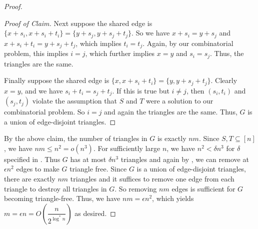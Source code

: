 \begin{proof}
\begin{proof}[Proof of Claim]
		Next suppose the shared edge is $\{x+s_i, x+s_i+t_i\} = \{y+s_j, y+s_j+t_j\}$. So we have $x + s_i = y+s_j$ and $x+s_i+t_i = y+s_j+t_j$, which implies $t_i = t_j$. Again, by our combinatorial problem, this implies $i = j$, which further implies $x = y$ and $s_i = s_j$. Thus, the triangles are the same.
		
		Finally suppose the shared edge is $\{x, x+s_i+t_i\} = \{y, y+s_j+t_j\}$. Clearly $x = y$, and we have $s_i + t_i = s_j + t_j$. If this is true but $i\neq j$, then $(s_i,t_i)$ and $(s_j, t_j)$ violate the assumption that $S$ and $T$ were a solution to our combinatorial problem. So $i = j$ and again the triangles are the same. Thus, $G$ is a union of edge-disjoint triangles.
	\end{proof}
	By the above claim, the number of triangles in $G$ is exactly $nm$. Since $S,T \subseteq [n]$, we have $nm \leq n^2 = o(n^3)$. For sufficiently large $n$, we have $n^2 < \delta n^3$ for $\delta$ specified in . Thus $G$ has at most $\delta n^3$ triangles and again by , we can remove at $\epsilon n^2$ edges to make $G$ triangle free. Since $G$ is a union of edge-disjoint triangles, there are exactly $nm$ triangles and it suffices to remove one edge from each triangle to destroy all triangles in $G$. So removing $nm$ edges is sufficient for $G$ becoming triangle-free. Thus, we have $nm = \epsilon n^2$, which yields $m = \epsilon n = O\left(\dfrac{n}{2^{\log^* n}}\right)$ as desired.
\end{proof}